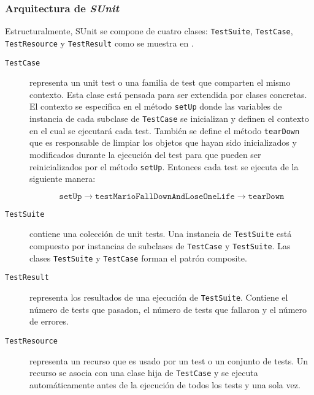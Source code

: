 \subsubsection{Arquitectura de \emph{SUnit}}
\par Estructuralmente, SUnit se compone de cuatro clases: {\tt TestSuite}, {\tt TestCase}, {\tt TestResource} y {\tt TestResult} como se muestra en . 
\begin{description}
\item[{\tt TestCase}] representa un unit test o una familia de test que comparten el mismo contexto. Esta clase está pensada para ser extendida por clases concretas. El contexto se especifica en el método {\tt setUp} donde las variables de instancia de cada subclase de {\tt TestCase} se inicializan y definen el contexto en el cual se ejecutará cada test. También se define el método {\tt tearDown} que es responsable de limpiar los objetos que hayan sido inicializados y modificados durante la ejecución del test para que pueden ser reinicializados por el método {\tt setUp}. Entonces cada test se ejecuta de la siguiente manera:

\[ \texttt{setUp} \rightarrow \texttt{testMarioFallDownAndLoseOneLife} \rightarrow \texttt{tearDown} \]

\item[{\tt TestSuite}] contiene una colección de unit tests. Una instancia de {\tt TestSuite} está compuesto por instancias de subclases de {\tt TestCase} y {\tt TestSuite}. Las clases {\tt TestSuite} y {\tt TestCase} forman el patrón composite. 

\item[{\tt TestResult}] representa los resultados de una ejecución de {\tt TestSuite}. Contiene el número de tests que pasadon, el número de tests que fallaron y el número de errores.

\item[{\tt TestResource}] representa un recurso que es usado por un test o un conjunto de tests. Un recurso se asocia con una clase hija de {\tt TestCase} y se ejecuta automáticamente antes de la ejecución de todos los tests y una sola vez.   
\end{description}


